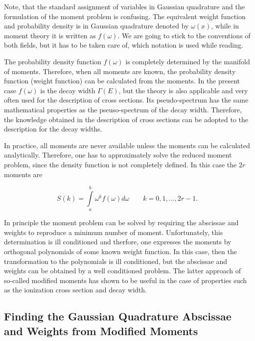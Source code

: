 Note, that the standard assignment of variables in Gaussian quadrature and the
formulation of the moment problem is confusing. The equivalent weight function
and probability density is in Gaussian quadrature denoted by $\omega(x)$, while
in moment theory it is written as $f(\omega)$. We are going to stick to the
conventions of both fields, but it has to be taken care of, which notation
is used while reading.

The probability density function $f(\omega)$ is completely determined by the manifold
of moments. Therefore, when all moments are known, the probability density
function  (weight function) can be calculated from the moments.
In the present case $f(\omega)$
is the decay width $\Gamma(E)$, but the theory is also applicable and very often
used for the description of cross sections. Its pseudo-spectrum has the same
mathematical properties as the pseuso-spectrum of the decay width. Therefore,
the knowledge obtained in the description of cross sections can be adopted to
the description for the decay widths.

In practice, all moments are never available unless the moments can be
calculated analytically. Therefore, one has to approximately solve the reduced
moment problem, since the density function is not completely defined.
In this case the $2r$ moments are

\begin{equation}
  S(k) = \int\limits_a^b \omega^k f(\omega) d\omega \quad\quad k=0,1,...,2r-1   .
\end{equation}

In principle the moment problem can be solved by requiring the abscissae and
weights to reproduce a minimum number of moment. Unfortunately, this determination
is ill conditioned and therfore, one expresses the moments by orthogonal
polynomials of some known weight function. In this case, then the
transformation to the polynomials is ill conditioned, but the abscissae
and weights can be obtained by a well conditioned problem. \cite{Blumstein73}
The latter approach
of so-called modified moments has shown to be useful in the case of
properties such as the ionization
cross section and decay width.





\subsection{Finding the Gaussian Quadrature Abscissae and Weights from Modified Moments}

